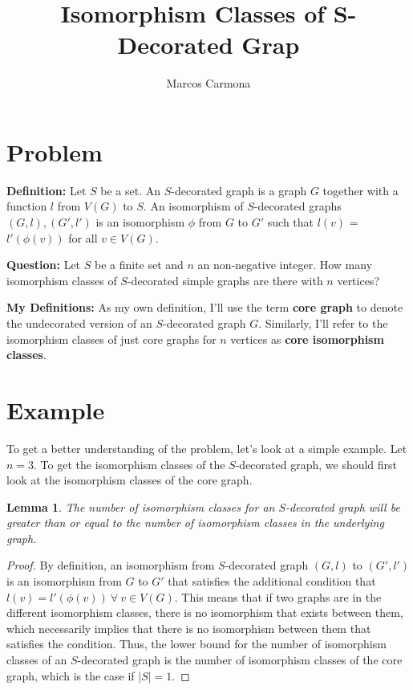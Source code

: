 \documentclass[11pt,reqno]{amsart}
\title{Isomorphism Classes of S-Decorated Grap}
\author[M. Carmona]{Marcos Carmona}
\newtheorem{lemma}[theorem]{Lemma}
\theoremstyle{definition}
\begin{document}
\maketitle
\setcounter{tocdepth}{1}

\section{Problem}
\textbf{Definition:}
    Let $S$ be a set. An $S$-decorated graph is a graph $G$ together with a function $l$ from $V(G)$ to $S$. An isomorphism of $S$-decorated graphs $(G, l), (G', l')$ is an isomorphism $\phi$ from $G$ to $G'$ such that $l(v)$ = $l'(\phi(v))$ for all $v \in V(G)$.

\textbf{Question:}
Let $S$ be a finite set and $n$ an non-negative integer. How many
isomorphism classes of $S$-decorated simple graphs are there with $n$ vertices?

\textbf{My Definitions:}
As my own definition, I'll use the term \textbf{core graph} to denote the undecorated version of an $S$-decorated graph $G$. Similarly, I'll refer to the isomorphism classes of just core graphs for $n$ vertices as \textbf{core isomorphism classes}. 

\section{Example}
\label{sec:Example}

To get a better understanding of the problem, let's look at a simple example. Let $n = 3$. To get the isomorphism classes of the $S$-decorated graph, we should first look at the isomorphism classes of the core graph. 

\begin{lemma}
    The number of isomorphism classes for an $S$-decorated graph will be greater than or equal to the number of isomorphism classes in the underlying graph.
\end{lemma}

\begin{proof}
    By definition, an isomorphism from $S$-decorated graph $(G, l)$ to $(G', l')$ is an isomorphism from $G$ to $G'$ that satisfies the additional condition that $l(v) = l'(\phi(v)) \: \forall \: v \in V(G)$. This means that if two graphs are in the different isomorphism classes, there is no isomorphism that exists between them, which necessarily implies that there is no isomorphism between them that satisfies the condition. Thus, the lower bound for the number of isomorphism classes of an $S$-decorated graph is the number of isomorphism classes of the core graph, which is the case if $\mid S \mid = 1$.
\end{proof}
\end{document}
